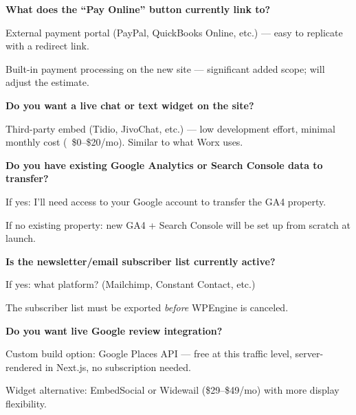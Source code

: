 \documentclass[11pt, letterpaper]{article}
\begin{document}
\begin{checklist}
  \item \textbf{What does the ``Pay Online'' button currently link to?}
    \begin{checklist}
      \item External payment portal (PayPal, QuickBooks Online, etc.) --- easy
            to replicate with a redirect link.
      \item Built-in payment processing on the new site --- significant added
            scope; will adjust the estimate.
    \end{checklist}

  \item \textbf{Do you want a live chat or text widget on the site?}
    \begin{checklist}
      \item Third-party embed (Tidio, JivoChat, etc.) --- low development effort,
            minimal monthly cost (~\$0--\$20/mo). Similar to what Worx uses.
    \end{checklist}

  \item \textbf{Do you have existing Google Analytics or Search Console data
        to transfer?}
    \begin{checklist}
      \item If yes: I'll need access to your Google account to transfer the GA4 property.
      \item If no existing property: new GA4 + Search Console will be set up from
            scratch at launch.
    \end{checklist}

  \item \textbf{Is the newsletter/email subscriber list currently active?}
    \begin{checklist}
      \item If yes: what platform? (Mailchimp, Constant Contact, etc.)
      \item The subscriber list must be exported \emph{before} WPEngine is canceled.
    \end{checklist}

  \item \textbf{Do you want live Google review integration?}
    \begin{checklist}
      \item Custom build option: Google Places API --- free at this traffic level,
            server-rendered in Next.js, no subscription needed.
      \item Widget alternative: EmbedSocial or Widewail (\$29--\$49/mo) with
            more display flexibility.
    \end{checklist}
\end{checklist}
\end{document}
